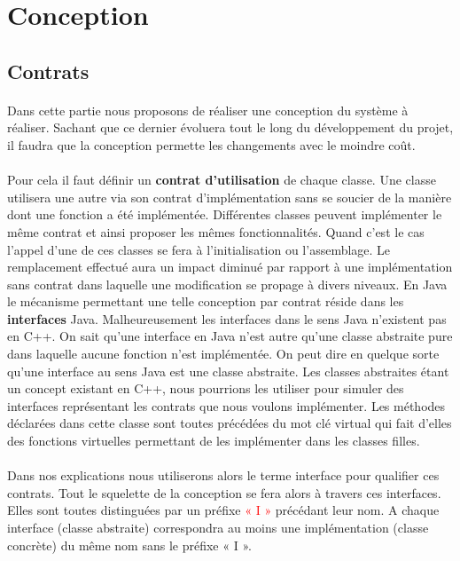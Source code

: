 \documentclass[a4paper, 10pt]{report}
\begin{document}
\section{Conception}
\subsection{Contrats}
\paragraph*{}
Dans cette partie nous proposons de réaliser une conception du système à réaliser. Sachant que ce dernier évoluera tout 
le long du développement du projet, il faudra que la conception permette les changements avec le moindre coût. 
\paragraph*{}
Pour cela il faut définir un \textbf{contrat d’utilisation} de chaque classe. Une classe utilisera une autre via son contrat 
d’implémentation sans se soucier de la manière dont une fonction a été implémentée. Différentes classes peuvent 
implémenter le même contrat et ainsi proposer les mêmes fonctionnalités. Quand c’est le cas l’appel d’une de ces classes 
se fera à l’initialisation ou l’assemblage. Le remplacement effectué aura un impact diminué par rapport à une implémentation 
sans contrat dans laquelle une modification se propage à divers niveaux. \newline
En Java le mécanisme permettant une telle conception par contrat réside dans les \textbf{interfaces} Java. Malheureusement 
les interfaces dans le sens Java n’existent pas en C++. On sait qu’une interface en Java n’est autre qu’une classe 
abstraite pure dans laquelle aucune fonction n’est implémentée. On peut dire en quelque sorte qu’une interface au sens 
Java est une classe abstraite. Les classes abstraites étant un concept existant en C++, nous pourrions les utiliser 
pour simuler des interfaces représentant les contrats que nous voulons implémenter. Les méthodes déclarées dans cette 
classe sont toutes précédées du mot clé virtual qui fait d’elles des fonctions virtuelles permettant de les implémenter 
dans les classes filles.
\paragraph*{}
Dans nos explications nous utiliserons alors le terme interface pour qualifier ces contrats. Tout le squelette de la 
conception se fera alors à travers ces interfaces. Elles sont toutes distinguées par un préfixe \textcolor{red}{« I »} précédant leur nom. 
A chaque interface (classe abstraite) correspondra au moins une implémentation (classe concrète) du même nom sans le 
préfixe « I ».
\end{document}
